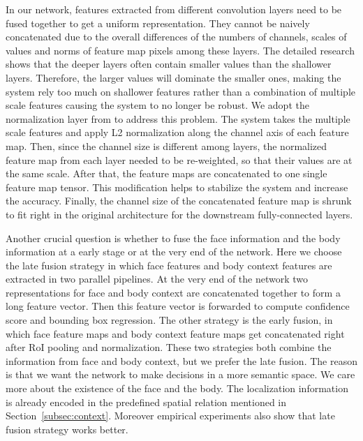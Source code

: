 \documentclass[10pt,journal,cspaper,compsoc]{IEEEtran}
\begin{document}
In our network, features extracted from different convolution layers need to be fused together to get a uniform representation. They cannot be naively concatenated due to the overall differences of the numbers of channels, scales of values and norms of feature map pixels among these layers. The detailed research shows that the deeper layers often contain smaller values than the shallower layers. Therefore, the larger values will dominate the smaller ones, making the system rely too much on shallower features rather than a combination of multiple scale features causing the system to no longer be robust. We adopt the normalization layer from \cite{liu2015parsenet} to address this problem. The system takes the multiple scale features and apply L2 normalization along the channel axis of each feature map. Then, since the channel size is different among layers, the normalized feature map from each layer needed to be re-weighted, so that their values are at the same scale. After that, the feature maps are concatenated to one single feature map tensor. This modification helps to stabilize the system and increase the accuracy. Finally, the channel size of the concatenated feature map is shrunk to fit right in the original architecture for the downstream fully-connected layers.

Another crucial question is whether to fuse the face information and the body information at a early stage or at the very end of the network. Here we choose the late fusion strategy in which face features and body context features are extracted in two parallel pipelines. At the very end of the network two representations for face and body context are concatenated together to form a long feature vector. Then this feature vector is forwarded to compute confidence score and bounding box regression. The other strategy is the early fusion, in which face feature maps and body context feature maps get concatenated right after RoI pooling and normalization. These two strategies both combine the information from face and body context, but we prefer the late fusion. The reason is that we want the network to make decisions in a more semantic space. We care more about the existence of the face and the body. The localization information is already encoded in the predefined spatial relation mentioned in Section~\ref{subsec:context}. Moreover empirical experiments also show that late fusion strategy works better.
\end{document}
